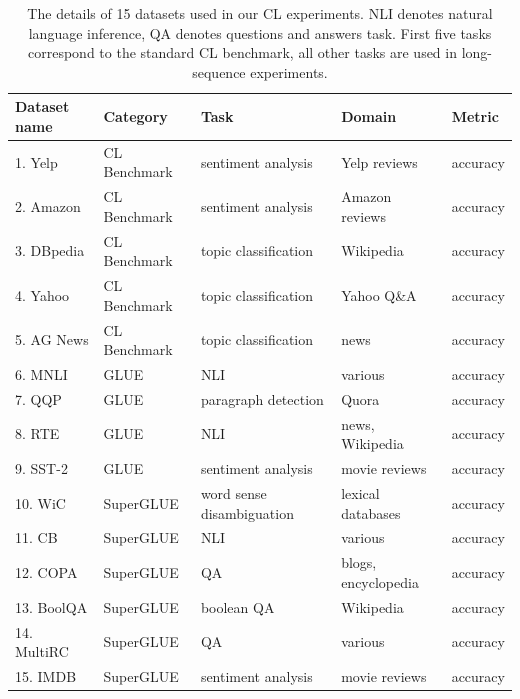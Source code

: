 \documentclass[letterpaper]{article} %
\begin{document}
\onecolumn  %
\begin{table}[htbp]
\centering
\begin{tabular}{lllll}
\toprule
\textbf{Dataset name} & \textbf{Category} & \textbf{Task} & \textbf{Domain} & \textbf{Metric} \\
\midrule
1. Yelp    & CL Benchmark & sentiment analysis      & Yelp reviews     & accuracy \\
2. Amazon  & CL Benchmark & sentiment analysis      & Amazon reviews   & accuracy \\
3. DBpedia & CL Benchmark & topic classification    & Wikipedia        & accuracy \\
4. Yahoo   & CL Benchmark & topic classification    & Yahoo Q\&A       & accuracy \\
5. AG News & CL Benchmark & topic classification    & news             & accuracy \\
6. MNLI    & GLUE         & NLI                    & various          & accuracy \\
7. QQP     & GLUE         & paragraph detection     & Quora            & accuracy \\
8. RTE     & GLUE         & NLI                    & news, Wikipedia  & accuracy \\
9. SST-2   & GLUE         & sentiment analysis      & movie reviews    & accuracy \\
10. WiC    & SuperGLUE    & word sense disambiguation & lexical databases & accuracy \\
11. CB     & SuperGLUE    & NLI                    & various          & accuracy \\
12. COPA   & SuperGLUE    & QA                     & blogs, encyclopedia & accuracy \\
13. BoolQA & SuperGLUE    & boolean QA             & Wikipedia        & accuracy \\
14. MultiRC& SuperGLUE    & QA                     & various          & accuracy \\
15. IMDB   & SuperGLUE    & sentiment analysis      & movie reviews    & accuracy \\
\bottomrule
\end{tabular}
\label{tabble:data}
\caption{The details of 15 datasets used in our CL experiments. NLI denotes natural language inference, QA denotes questions and answers task. First five tasks correspond to the standard CL benchmark, all other tasks are used in long-sequence experiments.}
\end{table}
\end{document}
